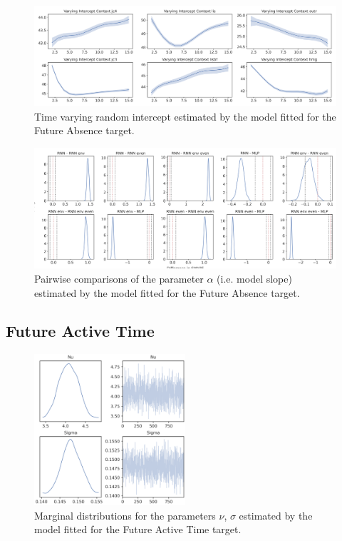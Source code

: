 \begin{figure}[ht]
\centering
\includegraphics[width=\textwidth]{images/appendix_C/Future Absence_interc_3.png}
\caption[\textbf{Future absence time-varying random intercept}]{Time varying random intercept estimated by the model fitted for the Future Absence target.}
\label{interc_abs_3}
\end{figure} \FloatBarrier

\begin{figure}[ht]
\centering
\includegraphics[width=\textwidth]{images/appendix_C/Future_Absence_comp_3.png}
\caption[\textbf{Future absence pairwise comparisons of model fixed effect}]{Pairwise comparisons of the parameter $\alpha$ (i.e. model slope) estimated by the model fitted for the Future Absence target.}
\label{comp_abs_3}
\end{figure} \FloatBarrier

\subsection{Future Active Time}
\label{future_act_bayes_3}

\begin{figure}[ht]
\centering
\includegraphics[width=0.5\textwidth]{images/appendix_C/Future Active Time_marginals_3.png}
\caption[\textbf{Future active time marginal distributions}]{Marginal distributions for the parameters $\nu$, $\sigma$ estimated by the model fitted for the Future Active Time target.}
\label{marginals_act_3}
\end{figure} \FloatBarrier

